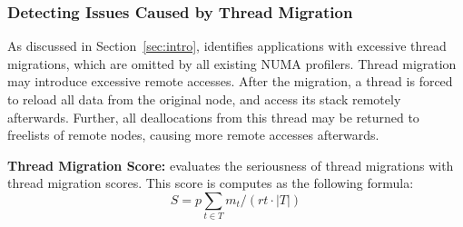 \subsubsection{Detecting Issues Caused by Thread Migration}

As discussed in Section~\ref{sec:intro}, \NP{} identifies applications with excessive thread migrations, which are omitted by all existing NUMA profilers. 
Thread migration may introduce excessive remote accesses. After the migration, a thread is forced to reload all data from the original node, and access its stack remotely afterwards. Further, all deallocations from this thread may be returned to freelists of remote nodes, causing more remote accesses afterwards.    


\textbf{Thread Migration Score:} \NP{} evaluates the seriousness of thread migrations with thread migration scores. This score is computes as the following formula: 
$$S = p \underset{t \in T}{\sum } m_{t} / (rt \cdot \left | T \right |)$$


